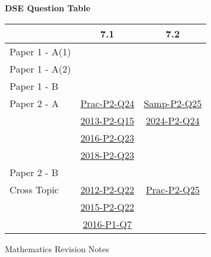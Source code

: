 \documentclass[12pt, a4paper]{article}
\begin{document}
\begin{absolutelynopagebreak}
\begin{center}
\textbf{DSE Question Table}
\end{center}
\begin{center}
\begin{tabular}{|l|c|c|}
\hline
        & 7.1 & 7.2 \\\hline
\hline
Paper 1 - A(1)&  &  \\
\hline
Paper 1 - A(2)&  &  \\
\hline
Paper 1 - B&  &  \\
\hline
\hline
Paper 2 - A& \hyperref[DSE2012P-CoreP2-Q24]{Prac-P2-Q24} & \hyperref[DSE2012S-CoreP2-Q25]{Samp-P2-Q25} \\
& \hyperref[DSE2013-CoreP2-Q15]{2013-P2-Q15} & \hyperref[DSE2024-CoreP2-Q24]{2024-P2-Q24} \\
& \hyperref[DSE2016-CoreP2-Q23]{2016-P2-Q23} &  \\
& \hyperref[DSE2018-CoreP2-Q23]{2018-P2-Q23} &  \\
\hline
Paper 2 - B&  &  \\
\hline
\hline
Cross Topic& \hyperref[DSE2012-CoreP2-Q22]{2012-P2-Q22} & \hyperref[DSE2012P-CoreP2-Q25]{Prac-P2-Q25} \\
& \hyperref[DSE2015-CoreP2-Q22]{2015-P2-Q22} &  \\
& \hyperref[DSE2016-CoreP1-Q07]{2016-P1-Q7} &  \\
\hline
\end{tabular}
\end{center}
\end{absolutelynopagebreak}
\newpage
\newpage
\thispagestyle{empty}
\begin{center}
Mathematics Revision Notes\\\vspace{1cm}
\\\vspace{1cm}
{\fontsize{24pt}{24pt}\selectfont {Areas and Volumes (I)}} \\\vspace{1cm}
\label{chapter:S1-8}

\end{center}
\vspace{0.5cm}
\hline
\end{document}
